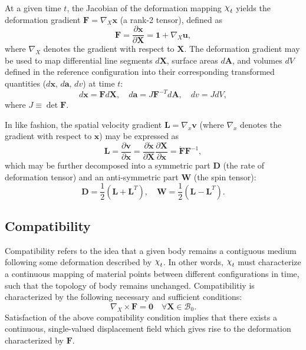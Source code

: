 At a given time $t$, the Jacobian of the deformation mapping $\raisebox{\depth}{$\chi$}_t$ yields the deformation gradient $\mathbf{F} = \nabla_X \mathbf{x}$ (a rank-2 tensor), defined as
\begin{equation}
  \mathbf{F} = \frac{\partial \mathbf{x}}{\partial \mathbf{X}} = \mathbf{1} + \nabla_X \mathbf{u},
\end{equation}
where $\nabla_X$ denotes the gradient with respect to $\mathbf{X}$. The deformation gradient may be used to map differential line segments $d \mathbf{X}$, surface areas $d \mathbf{A}$, and volumes $d V$ defined in the reference configuration into their corresponding transformed quantities ($d \mathbf{x}$, $d \mathbf{a}$, $dv$) at time $t$:
\begin{equation}
  d \mathbf{x} = \mathbf{F} d \mathbf{X}, \quad d \mathbf{a} = J \mathbf{F}^{-T} d \mathbf{A}, \quad d v = J d V,
\end{equation}
where $J \equiv \det{\mathbf{F}}$.

In like fashion, the spatial velocity gradient $\mathbf{L} = \nabla_x \mathbf{v}$ (where $\nabla_x$ denotes the gradient with respect to $\mathbf{x}$) may be expressed as
\begin{equation}
  \mathbf{L} = \frac{\partial \mathbf{v}}{\partial \mathbf{x}} = \frac{\partial \dot{\mathbf{x}}}{\partial \mathbf{X}} \frac{\partial \mathbf{X}}{\partial \mathbf{x}} = \dot{\mathbf{F}} \mathbf{F}^{-1},
\end{equation}
which may be further decomposed into a symmetric part $\mathbf{D}$ (the rate of deformation tensor) and an anti-symmetric part $\mathbf{W}$ (the spin tensor):
\begin{equation}
  \mathbf{D} = \frac{1}{2} (\mathbf{L} + \mathbf{L}^T), \quad \mathbf{W} = \frac{1}{2} (\mathbf{L} - \mathbf{L}^T).
\end{equation}

\subsection*{Compatibility}

Compatibility refers to the idea that a given body remains a contiguous medium following some deformation described by $\raisebox{\depth}{$\chi$}_t$. In other words, $\raisebox{\depth}{$\chi$}_t$ must characterize a continuous mapping of material points between different configurations in time, such that the topology of body remains unchanged. Compatibilitiy is characterized by the following necessary and sufficient conditions:
\begin{equation}
  \nabla_X \times \mathbf{F} = \mathbf{0} \quad \forall \mathbf{X} \in \mathcal{B}_0.
  \label{eq:compatibility}
\end{equation}
Satisfaction of the above compatibility condition implies that there exists a continuous, single-valued displacement field which gives rise to the deformation characterized by $\mathbf{F}$.


